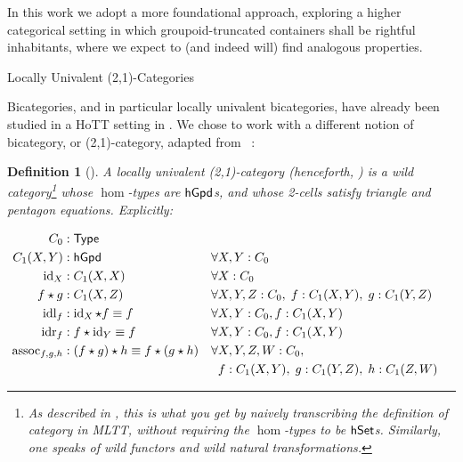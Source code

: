 \documentclass[a4paper]{easychair}
\newtheorem*{definition}{Definition}
\begin{document}
In this work we adopt a more foundational approach, exploring a higher
categorical setting in which groupoid-truncated containers shall be rightful
inhabitants, where we expect to (and indeed will) find analogous properties.

\begin{section}{Locally Univalent (2,1)-Categories}

  Bicategories, and in particular locally univalent bicategories, have
  already been studied in a HoTT setting in \cite{Ahrens2021}.
  We chose to work with a different notion of bicategory, or (2,1)-category, adapted from
  ~\cite[Definition 5]{Finster2021}:

  \begin{definition}[\lutc{}]
    A locally univalent (2,1)-category (henceforth, \lutc{}) is a wild
    category\footnote{As described in \cite{Capriotti2017}, this is what you get
    by naively transcribing the definition of category in MLTT, without
    requiring the \(\hom\)-types to be \(\mathsf{hSet}\)s. Similarly, one speaks of wild
    functors and wild natural transformations.} whose \(\hom\)-types are
    \(\mathsf{hGpd}\)s, and whose 2-cells satisfy triangle and pentagon equations.
    Explicitly:

    \begin{align*}
      C_0              & : \mathsf{Type}                                                                                                        \\
      C_1(X , Y)       & : \mathsf{hGpd}                                          & \forall & X , Y : C_0                                       \\
      \operatorname{id}_X            & : C_1(X , X)                                     & \forall & X : C_0                                           \\
      f \star g        & : C_1(X , Z)                                     & \forall & X, Y, Z : C_0, \; f : C_1(X, Y), \; g : C_1(Y, Z) \\
      \operatorname{idl}_f           & : \operatorname{id}_X \star f \equiv f                         & \forall & X , Y : C_0, f : C_1(X,Y)                         \\
      \operatorname{idr}_f           & : f \star \operatorname{id}_Y \equiv f                         & \forall & X , Y : C_0, f : C_1(X,Y)                         \\
      \operatorname{assoc}_{f, g, h} & : (f \star g) \star h \equiv f \star (g \star h) & \forall & X , Y , Z , W : C_0,                              \\
                       &                                                  &         & f : C_1(X, Y), \; g : C_1(Y, Z), \; h : C_1(Z, W)
    \end{align*}


\end{definition}
\end{section}
\end{document}
